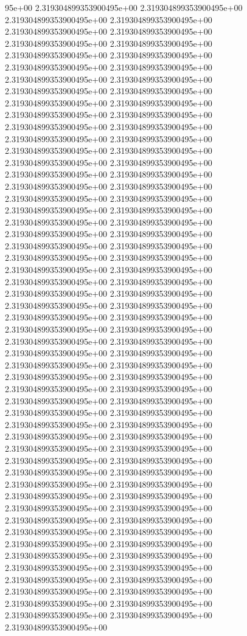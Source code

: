 95e+00	2.319304899353900495e+00	2.319304899353900495e+00	2.319304899353900495e+00	2.319304899353900495e+00	2.319304899353900495e+00	2.319304899353900495e+00	2.319304899353900495e+00	2.319304899353900495e+00	2.319304899353900495e+00	2.319304899353900495e+00	2.319304899353900495e+00	2.319304899353900495e+00	2.319304899353900495e+00	2.319304899353900495e+00	2.319304899353900495e+00	2.319304899353900495e+00	2.319304899353900495e+00	2.319304899353900495e+00	2.319304899353900495e+00	2.319304899353900495e+00	2.319304899353900495e+00	2.319304899353900495e+00	2.319304899353900495e+00	2.319304899353900495e+00	2.319304899353900495e+00	2.319304899353900495e+00	2.319304899353900495e+00	2.319304899353900495e+00	2.319304899353900495e+00	2.319304899353900495e+00	2.319304899353900495e+00	2.319304899353900495e+00	2.319304899353900495e+00	2.319304899353900495e+00	2.319304899353900495e+00	2.319304899353900495e+00	2.319304899353900495e+00	2.319304899353900495e+00	2.319304899353900495e+00	2.319304899353900495e+00	2.319304899353900495e+00	2.319304899353900495e+00	2.319304899353900495e+00	2.319304899353900495e+00	2.319304899353900495e+00	2.319304899353900495e+00	2.319304899353900495e+00	2.319304899353900495e+00	2.319304899353900495e+00	2.319304899353900495e+00	2.319304899353900495e+00	2.319304899353900495e+00	2.319304899353900495e+00	2.319304899353900495e+00	2.319304899353900495e+00	2.319304899353900495e+00	2.319304899353900495e+00	2.319304899353900495e+00	2.319304899353900495e+00	2.319304899353900495e+00	2.319304899353900495e+00	2.319304899353900495e+00	2.319304899353900495e+00	2.319304899353900495e+00	2.319304899353900495e+00	2.319304899353900495e+00	2.319304899353900495e+00	2.319304899353900495e+00	2.319304899353900495e+00	2.319304899353900495e+00	2.319304899353900495e+00	2.319304899353900495e+00	2.319304899353900495e+00	2.319304899353900495e+00	2.319304899353900495e+00	2.319304899353900495e+00	2.319304899353900495e+00	2.319304899353900495e+00	2.319304899353900495e+00	2.319304899353900495e+00	2.319304899353900495e+00	2.319304899353900495e+00	2.319304899353900495e+00	2.319304899353900495e+00	2.319304899353900495e+00	2.319304899353900495e+00	2.319304899353900495e+00	2.319304899353900495e+00	2.319304899353900495e+00	2.319304899353900495e+00	2.319304899353900495e+00	2.319304899353900495e+00	2.319304899353900495e+00	2.319304899353900495e+00	2.319304899353900495e+00	2.319304899353900495e+00	2.319304899353900495e+00	2.319304899353900495e+00	2.319304899353900495e+00	2.319304899353900495e+00	2.319304899353900495e+00	2.319304899353900495e+00	2.319304899353900495e+00	2.319304899353900495e+00	2.319304899353900495e+00
